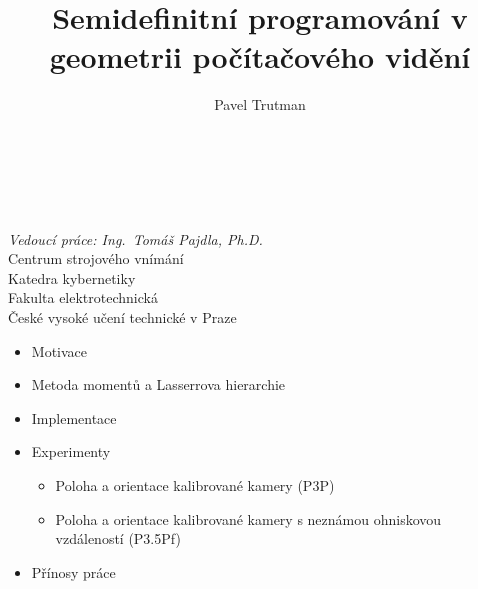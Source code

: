 \documentclass[cmpiitalkstyle, 22pt]{cmptalk}
\author{Pavel Trutman}
\affiliation{Centrum strojového vnímání}
\title{Semidefinitní programování v geometrii počítačového vidění}
\begin{document}
\fontsize{22pt}{26.4pt}\selectfont
\bigfigfalse
\begin{talktitlepage}
  {\fontsize{26pt}{31.2pt}\selectfont
  \mbox{}\\
  {\LARGE\bfseries \thetitle }\\[\baselineskip]
  \theauthor \\[\baselineskip]
  \textit{Vedoucí práce: Ing.\ Tomáš Pajdla, Ph.D.}
  \vfill
  \thetalklogo\\[1cm]
  Centrum strojového vnímání\\
  Katedra kybernetiky\\
  Fakulta elektrotechnická\\
  České vysoké učení technické v Praze
  \vspace{2cm}
  }
\end{talktitlepage}

\begin{cmptalkslide}[Obsah]
  \begin{itemize}
    \item Motivace
    \item Metoda momentů a Lasserrova hierarchie
    \item Implementace
    \item Experimenty
    \begin{itemize}
      \item Poloha a orientace kalibrované kamery (P3P)
      \item Poloha a orientace kalibrované kamery s neznámou ohniskovou vzdáleností (P3.5Pf)
    \end{itemize}
    \item Přínosy práce
  \end{itemize}
\end{cmptalkslide}
\end{document}
